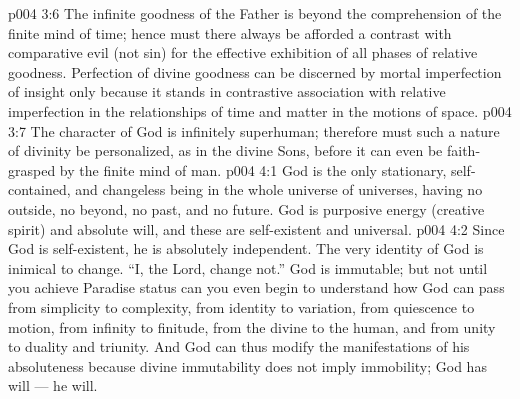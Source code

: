 \vs p004 3:6 The infinite goodness of the Father is beyond the comprehension of the finite mind of time; hence must there always be afforded a contrast with comparative evil (not sin) for the effective exhibition of all phases of relative goodness. Perfection of divine goodness can be discerned by mortal imperfection of insight only because it stands in contrastive association with relative imperfection in the relationships of time and matter in the motions of space.
\vs p004 3:7 The character of God is infinitely superhuman; therefore must such a nature of divinity be personalized, as in the divine Sons, before it can even be faith\hyp{}grasped by the finite mind of man.
\vs p004 4:1 God is the only stationary, self\hyp{}contained, and changeless being in the whole universe of universes, having no outside, no beyond, no past, and no future. God is purposive energy (creative spirit) and absolute will, and these are self\hyp{}existent and universal.
\vs p004 4:2 Since God is self\hyp{}existent, he is absolutely independent. The very identity of God is inimical to change. “I, the Lord, change not.” God is immutable; but not until you achieve Paradise status can you even begin to understand how God can pass from simplicity to complexity, from identity to variation, from quiescence to motion, from infinity to finitude, from the divine to the human, and from unity to duality and triunity. And God can thus modify the manifestations of his absoluteness because divine immutability does not imply immobility; God has will --- he  will.
